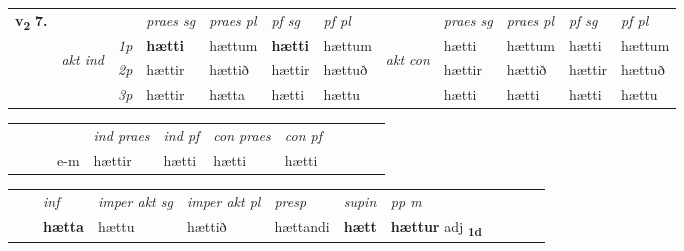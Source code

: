\begin{tabular}{llllllllllll} \toprule
\multirow{4}{*}{{{\textbf{v{\textsubscript{2}}} \Large{\textbf{7.}}}}}  & &   &  \textit{praes sg}  & \textit{praes pl}  &\textit{ pf sg} & \textit{pf pl} &  &  \textit{praes sg}  & \textit{praes pl}  & \textit{pf sg} & \textit{pf pl } \\*
	\cmidrule{4-7} \cmidrule{9-12}
 & \multirow{3}{*}{\begin{turn}{90}\textit{akt ind}\end{turn}} & {\textit{1p}} & \textbf{hætti} & hættum    & \textbf{hætti} & hættum & \multirow{3}{*}{\begin{turn}{90}\textit{akt con}\end{turn}} &hætti & hættum & hætti & hættum\\*
& &  {\textit{2p}} &  hættir  & hættið   & hættir & hættuð & & hættir & hættið & hættir & hættuð \\*
& &  {\textit{3p}} & hættir & hætta   & hætti & hættu & & hætti & hætti& hætti & hættu  \\*
\cmidrule{4-7} \cmidrule{9-12}
\end{tabular}


\begin{tabular}{llllllllllll}
 & &  & &  \textit{ind praes} & \textit{ind pf} & \textit{con praes} & \textit{con pf} \\*
&  & & e-m & hættir & hætti & hætti & hætti \\*
\cmidrule{5-9}
\end{tabular}


\begin{tabular}{llllllllllll}
 & & \textit{inf} & \textit{imper akt sg} & \textit{imper akt pl}   & \textit{presp} & \textit{supin}  & \textit{pp m}     \\*
  & & \textbf{hætta} & hættu  & hættið   & hættandi &  \textbf{hætt}  & \textbf{hættur} adj \textbf{\textsubscript{1d}} \\*
\cmidrule{1-12}
\end{tabular}




